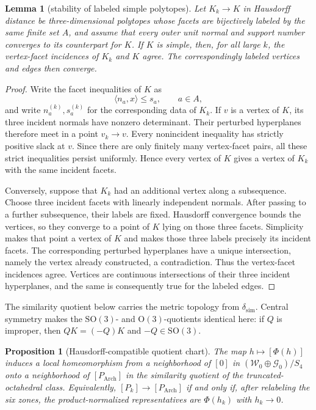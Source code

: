 \documentclass[11pt]{article}
\newcommand{\Arch}{P_{\mathrm{Arch}}}
\newtheorem{proposition}[proposition]{Proposition}
\newtheorem{lemma}[lemma]{Lemma}
\theoremstyle{remark}
\begin{document}
\begin{lemma}[stability of labeled simple polytopes]\label{lem:simple-stability}
Let $K_k\to K$ in Hausdorff distance be three-dimensional polytopes whose facets are
bijectively labeled by the same finite set $A$, and assume that every outer unit normal and support
number converges to its counterpart for $K$.  If $K$ is simple, then, for all large $k$,
the vertex-facet incidences of $K_k$ and $K$ agree.  The correspondingly labeled vertices
and edges then converge.
\end{lemma}

\begin{proof}
Write the facet inequalities of $K$ as
\[
 \langle n_a,x\rangle\le s_a,\qquad a\in A,
\]
and write $n_a^{(k)},s_a^{(k)}$ for the corresponding data of $K_k$.  If $v$ is a vertex
of $K$, its three incident normals have nonzero determinant.  Their perturbed hyperplanes
therefore meet in a point $v_k\to v$.  Every nonincident inequality has strictly positive
slack at $v$. 
Since there are only finitely many vertex-facet pairs, all these strict inequalities persist uniformly.  Hence every vertex of $K$ gives a vertex of $K_k$ with the same incident facets.

Conversely, suppose that $K_k$ had an additional vertex along a subsequence.  Choose three incident facets with linearly independent normals.  
After passing to a further subsequence, their labels
are fixed.  
Hausdorff convergence bounds the vertices, so they converge to a point of $K$ lying on those three
facets.  Simplicity makes that point a vertex of $K$ and makes those three labels precisely
its incident facets.  The corresponding perturbed hyperplanes have a unique intersection,
namely the vertex already constructed, a contradiction.  Thus the vertex-facet incidences
agree.  Vertices are continuous
intersections of their three incident hyperplanes, and the same is consequently true for
the labeled edges.
\end{proof}

The similarity quotient below carries the metric topology from $\delta_{\mathrm{sim}}$.
Central symmetry makes the $\mathrm{SO}(3)$- and $\mathrm O(3)$-quotients identical here:
if $Q$ is improper, then $QK=(-Q)K$ and $-Q\in\mathrm{SO}(3)$.

\begin{proposition}[Hausdorff-compatible quotient chart]\label{prop:topology}
The map $h\mapsto[\Phi(h)]$ induces a local homeomorphism from a neighborhood of $[0]$ in
$(\mathcal W_0\oplus\mathcal G_0)/S_4$ onto a neighborhood of $[\Arch]$ in the
similarity quotient of the truncated-octahedral class.  Equivalently, $[P_k]\to[\Arch]$
if and only if, after relabeling the six zones, the product-normalized representatives are
$\Phi(h_k)$ with $h_k\to0$.
\end{proposition}
\end{document}

